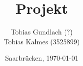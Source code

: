 \begin{titlepage}

	\titlehead
	{
		\texttt{[image: images/logos/HTW]}		
		\hfill
		\texttt{[image: images/logos/android]}		
	}
	
	\subject
	{
		\Huge Dokumentation\\
		\normalsize Mobile Computing\\
	}
	
	\title
	{
		Projekt
	}
	
	\author
	{	
		Tobias Gundlach (?)\\
		Tobias Kalmes (3525899)
	}
	
	\date
	{
		\normalsize{Saarbrücken, \today}
	}	
	\maketitle	
\end{titlepage}
